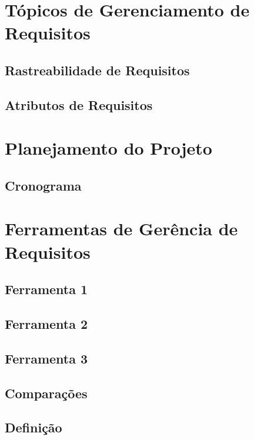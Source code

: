 \chapter[Tópicos de Gerenciamento de Requisitos]{Tópicos de Gerenciamento de Requisitos}
\section{Rastreabilidade de Requisitos}
\section{Atributos de Requisitos}

\chapter[Planejamento do Projeto]{Planejamento do Projeto}
\section{Cronograma}

\chapter[Ferramentas de Gerência de Requisitos]{Ferramentas de Gerência de Requisitos}
\section{Ferramenta 1}
\section{Ferramenta 2}
\section{Ferramenta 3}
\section{Comparações}
\section{Definição}

